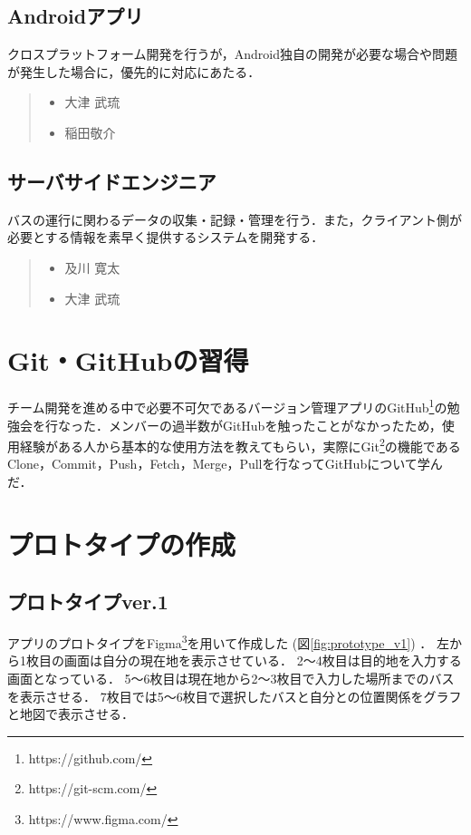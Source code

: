\subsection{Androidアプリ}
クロスプラットフォーム開発を行うが，Android独自の開発が必要な場合や問題が発生した場合に，優先的に対応にあたる．
\begin{quote}
    \begin{itemize}
        \item 大津 武琉
        \item 稲田敬介
    \end{itemize}
\end{quote}

\subsection{サーバサイドエンジニア}
バスの運行に関わるデータの収集・記録・管理を行う．また，クライアント側が必要とする情報を素早く提供するシステムを開発する．
\begin{quote}
    \begin{itemize}
        \item 及川 寛太
        \item 大津 武琉
    \end{itemize}
\end{quote}

\section{Git・GitHubの習得}
チーム開発を進める中で必要不可欠であるバージョン管理アプリのGitHub\footnote{https://github.com/}の勉強会を行なった．メンバーの過半数がGitHubを触ったことがなかったため，使用経験がある人から基本的な使用方法を教えてもらい，実際にGit\footnote{https://git-scm.com/}の機能であるClone，Commit，Push，Fetch，Merge，Pullを行なってGitHubについて学んだ．

\section{プロトタイプの作成}
\subsection{プロトタイプver.1}
アプリのプロトタイプをFigma\footnote{https://www.figma.com/}を用いて作成した (図\ref{fig:prototype_v1}) ．
左から1枚目の画面は自分の現在地を表示させている．
2〜4枚目は目的地を入力する画面となっている．
5〜6枚目は現在地から2〜3枚目で入力した場所までのバスを表示させる．
7枚目では5〜6枚目で選択したバスと自分との位置関係をグラフと地図で表示させる．

